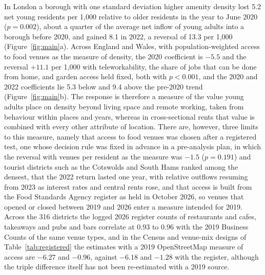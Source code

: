 \documentclass[11pt,a4paper]{article}
\begin{document}
In London a borough with one standard deviation higher amenity density lost 5.2 net young residents per 1,000 relative to older residents in the year to June 2020 ($p = 0.002$), about a quarter of the average net inflow of young adults into a borough before 2020, and gained 8.1 in 2022, a reversal of 13.3 per 1,000 (Figure~\ref{fig:main}a). Across England and Wales, with population-weighted access to food venues as the measure of density, the 2020 coefficient is $-5.5$ and the reversal $+11.1$ per 1,000 with teleworkability, the share of jobs that can be done from home, and garden access held fixed, both with $p < 0.001$, and the 2020 and 2022 coefficients lie 5.3 below and 9.4 above the pre-2020 trend (Figure~\ref{fig:main}b). The response is therefore a measure of the value young adults place on density beyond living space and remote working, taken from behaviour within places and years, whereas in cross-sectional rents that value is combined with every other attribute of location. There are, however, three limits to this measure, namely that access to food venues was chosen after a registered test, one whose decision rule was fixed in advance in a pre-analysis plan, in which the reversal with venues per resident as the measure was $-1.5$ ($p = 0.191$) and tourist districts such as the Cotswolds and South Hams ranked among the densest, that the 2022 return lasted one year, with relative outflows resuming from 2023 as interest rates and central rents rose, and that access is built from the Food Standards Agency register as held in October 2026, so venues that opened or closed between 2019 and 2026 enter a measure intended for 2019. Across the 316 districts the logged 2026 register counts of restaurants and cafes, takeaways and pubs and bars correlate at 0.93 to 0.96 with the 2019 Business Counts of the same venue types, and in the Census and venue-mix designs of Table~\ref{tab:registered} the estimates with a 2019 OpenStreetMap measure of access are $-6.27$ and $-0.96$, against $-6.18$ and $-1.28$ with the register, although the triple difference itself has not been re-estimated with a 2019 source.
\end{document}
